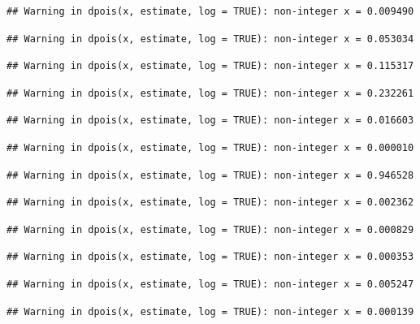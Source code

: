 \documentclass[]{article}
\begin{document}
\begin{verbatim}
## Warning in dpois(x, estimate, log = TRUE): non-integer x = 0.009490
\end{verbatim}

\begin{verbatim}
## Warning in dpois(x, estimate, log = TRUE): non-integer x = 0.053034
\end{verbatim}

\begin{verbatim}
## Warning in dpois(x, estimate, log = TRUE): non-integer x = 0.115317
\end{verbatim}

\begin{verbatim}
## Warning in dpois(x, estimate, log = TRUE): non-integer x = 0.232261
\end{verbatim}

\begin{verbatim}
## Warning in dpois(x, estimate, log = TRUE): non-integer x = 0.016603
\end{verbatim}

\begin{verbatim}
## Warning in dpois(x, estimate, log = TRUE): non-integer x = 0.000010
\end{verbatim}

\begin{verbatim}
## Warning in dpois(x, estimate, log = TRUE): non-integer x = 0.946528
\end{verbatim}

\begin{verbatim}
## Warning in dpois(x, estimate, log = TRUE): non-integer x = 0.002362
\end{verbatim}

\begin{verbatim}
## Warning in dpois(x, estimate, log = TRUE): non-integer x = 0.000829
\end{verbatim}

\begin{verbatim}
## Warning in dpois(x, estimate, log = TRUE): non-integer x = 0.000353
\end{verbatim}

\begin{verbatim}
## Warning in dpois(x, estimate, log = TRUE): non-integer x = 0.005247
\end{verbatim}

\begin{verbatim}
## Warning in dpois(x, estimate, log = TRUE): non-integer x = 0.000139
\end{verbatim}
\end{document}
